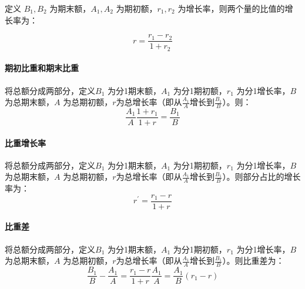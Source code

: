 定义 $B_1,B_2$ 为期末额，$A_1,A_2$ 为期初额，$r_1,r_2$ 为增长率，则两个量的比值的增长率为：

\[
	r = \frac{r_1-r_2}{1+r_2}
\]

\paragraph{期初比重和期末比重}

将总额分成两部分，定义$B_1$ 为分1期末额，$A_1$ 为分1期初额，$r_1$ 为分1增长率，$B$ 为总期末额，$A$ 为总期初额，$r$为总增长率（即从$\frac{A_1}{A}$增长到$\frac{B_1}{B}$）。则：
\[
	\frac{A_1}{A} \frac{1+r_1}{1+r} = \frac{B_1}{B}
\]

\paragraph{比重增长率}

将总额分成两部分，定义$B_1$ 为分1期末额，$A_1$ 为分1期初额，$r_1$ 为分1增长率，$B$ 为总期末额，$A$ 为总期初额，$r$为总增长率（即从$\frac{A_1}{A}$增长到$\frac{B_1}{B}$）。则部分占比的增长率为：
\[
	r^\prime = \frac{r_1-r}{1+r}
\]

\paragraph{比重差}
将总额分成两部分，定义$B_1$ 为分1期末额，$A_1$ 为分1期初额，$r_1$ 为分1增长率，$B$ 为总期末额，$A$ 为总期初额，$r$为总增长率（即从$\frac{A_1}{A}$增长到$\frac{B_1}{B}$）。则比重差为：
\[
	\frac{B_1}{B} - \frac{A_1}{A} = \frac{r_1 - r}{1+r}\frac{A_1}{A} = \frac{A_1}{B} (r_1-r)
\]